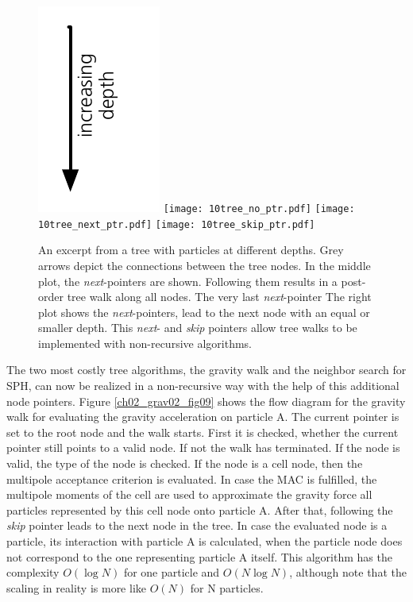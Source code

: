 \begin{figure}
\begin{center}
\includegraphics[scale=0.80]{10tree_depth.pdf}
\texttt{[image: 10tree\_no\_ptr.pdf]}
\texttt{[image: 10tree\_next\_ptr.pdf]}
\texttt{[image: 10tree\_skip\_ptr.pdf]}
\caption{An excerpt from a  tree with particles at different depths. Grey arrows depict the connections between the tree nodes. In the middle plot, the \emph{next}-pointers are shown. Following them results in a post-order tree walk along all nodes. The very last \emph{next}-pointer The right plot shows the \emph{next}-pointers, lead to the next node with an equal or smaller depth. This \emph{next}- and \emph{skip} pointers allow tree walks to be implemented with non-recursive algorithms.}
\label{ch02_fig10}
\end{center}
\end{figure}

The two most costly tree algorithms, the gravity walk and the neighbor search for SPH, can now be realized in a non-recursive way with the help of this additional node pointers. Figure \ref{ch02_grav02_fig09} shows the flow diagram for the gravity walk for evaluating the gravity acceleration on particle A. The current pointer is set to the root node and the walk starts. First it is checked, whether the current pointer still points to a valid node. If not the walk has terminated. If the node is valid, the type of the node is checked. If the node is a cell node, then the multipole acceptance criterion is evaluated. In case the MAC is fulfilled, the multipole moments of the cell are used to approximate the gravity force all particles represented by this cell node onto particle A. After that, following the \emph{skip} pointer leads to the next node in the tree. In case the evaluated node is a particle, its interaction with particle A is calculated, when the particle node does not correspond to the one representing particle A itself. This algorithm has the complexity $O(\log{N})$ for one particle and $O(N \log{N})$, although \cite{1986Natur.324..446B} note that the scaling in reality is more like $O(N)$ for N particles.

